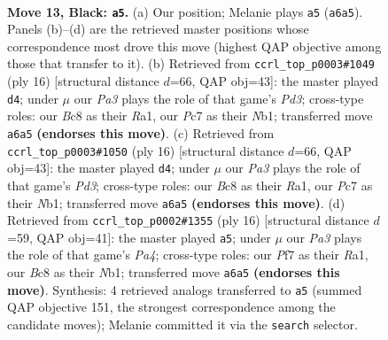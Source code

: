 \documentclass[11pt]{article}
\begin{document}
\clearpage

\begin{figure}[p]\centering
\begin{subfigure}{0.46\textwidth}\centering
\resizebox{\linewidth}{!}{%
\newchessgame
\chessboard[
  setfen={2b1qrk1/rppnnppp/p3p3/3pP3/3P1P2/2N3K1/PPP3PP/R2Q1BNR b - - 11 13},
  showmover=false,
  pgfstyle=straightmove, color=movearrow, markmove={a6-a5}
]}
\caption{}
\end{subfigure}\hfill
\begin{subfigure}{0.46\textwidth}\centering
\resizebox{\linewidth}{!}{%
\newchessgame
\chessboard[
  setfen={r1b1kb1r/p1q2ppp/2pp1n2/2p1p3/4P3/2PP1N2/PP3PPP/RNBQR1K1 w kq - 0 9},
  showmover=false,
  pgfstyle=straightmove, color=movearrow, markmove={d3-d4}
]}
\caption{}
\end{subfigure}
\\[4pt]
\begin{subfigure}{0.46\textwidth}\centering
\resizebox{\linewidth}{!}{%
\newchessgame
\chessboard[
  setfen={r1b1kb1r/p1q2ppp/2pp1n2/2p1p3/4P3/2PP1N2/PP3PPP/RNBQR1K1 w kq - 0 9},
  showmover=false,
  pgfstyle=straightmove, color=movearrow, markmove={d3-d4}
]}
\caption{}
\end{subfigure}\hfill
\begin{subfigure}{0.46\textwidth}\centering
\resizebox{\linewidth}{!}{%
\newchessgame
\chessboard[
  setfen={r1b1k2r/pp2qpbp/2p2np1/2p1p3/P3P3/3P1N2/1PP2PPP/RNBQR1K1 w kq - 1 9},
  showmover=false,
  pgfstyle=straightmove, color=movearrow, markmove={a4-a5}
]}
\caption{}
\end{subfigure}
\caption{\textbf{Move 13, Black: \texttt{a5}.} (a) Our position; Melanie plays \texttt{a5} (\texttt{a6a5}). Panels (b)--(d) are the retrieved master positions whose correspondence most drove this move (highest QAP objective among those that transfer to it). (b) Retrieved from \texttt{ccrl\_top\_p0003\#1049} (ply 16) [structural distance $d$=66, QAP obj=43]: the master played \texttt{d4}; under $\mu$ our \emph{Pa3} plays the role of that game's \emph{Pd3}; cross-type roles: our \emph{B}c8 as their \emph{R}a1, our \emph{P}c7 as their \emph{N}b1; transferred move \texttt{a6a5} \textbf{(endorses this move)}. (c) Retrieved from \texttt{ccrl\_top\_p0003\#1050} (ply 16) [structural distance $d$=66, QAP obj=43]: the master played \texttt{d4}; under $\mu$ our \emph{Pa3} plays the role of that game's \emph{Pd3}; cross-type roles: our \emph{B}c8 as their \emph{R}a1, our \emph{P}c7 as their \emph{N}b1; transferred move \texttt{a6a5} \textbf{(endorses this move)}. (d) Retrieved from \texttt{ccrl\_top\_p0002\#1355} (ply 16) [structural distance $d$=59, QAP obj=41]: the master played \texttt{a5}; under $\mu$ our \emph{Pa3} plays the role of that game's \emph{Pa4}; cross-type roles: our \emph{P}f7 as their \emph{R}a1, our \emph{B}c8 as their \emph{N}b1; transferred move \texttt{a6a5} \textbf{(endorses this move)}. Synthesis: 4 retrieved analogs transferred to \texttt{a5} (summed QAP objective 151, the strongest correspondence among the candidate moves); Melanie committed it via the \texttt{search} selector.}
\label{fig:thought-m25}
\end{figure}
\end{document}
